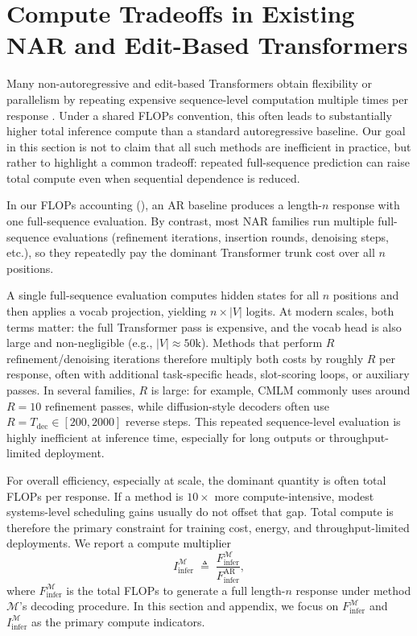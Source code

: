 \documentclass[11pt]{article}
\begin{document}
\section{Compute Tradeoffs in Existing NAR and Edit-Based Transformers}
\label{sec:why_nar_costs}

Many non-autoregressive and edit-based Transformers obtain flexibility or parallelism by repeating expensive sequence-level computation multiple times per response \citep{lee2018deterministic,ghazvininejad2019maskpredict,gu2019levenshtein,li2022diffusionlm,lou2024sedd,sahoo2024mdlm}. Under a shared FLOPs convention, this often leads to substantially higher total inference compute than a standard autoregressive baseline. Our goal in this section is not to claim that all such methods are inefficient in practice, but rather to highlight a common tradeoff: repeated full-sequence prediction can raise total compute even when sequential dependence is reduced.

In our FLOPs accounting (), an AR baseline produces a length-$n$ response with one full-sequence evaluation. By contrast, most NAR families run multiple full-sequence evaluations (refinement iterations, insertion rounds, denoising steps, etc.), so they repeatedly pay the dominant Transformer trunk cost over all $n$ positions.

A single full-sequence evaluation computes hidden states for all $n$ positions and then applies a vocab projection, yielding $n\times |V|$ logits. At modern scales, both terms matter: the full Transformer pass is expensive, and the vocab head is also large and non-negligible (e.g., $|V|\approx 50\text{k}$). Methods that perform $R$ refinement/denoising iterations therefore multiply both costs by roughly $R$ per response, often with additional task-specific heads, slot-scoring loops, or auxiliary passes. In several families, $R$ is large: for example, CMLM commonly uses around $R=10$ refinement passes, while diffusion-style decoders often use $R=T_{\text{dec}}\in[200,2000]$ reverse steps. This repeated sequence-level evaluation is highly inefficient at inference time, especially for long outputs or throughput-limited deployment.

For overall efficiency, especially at scale, the dominant quantity is often total FLOPs per response. If a method is $10\times$ more compute-intensive, modest systems-level scheduling gains usually do not offset that gap. Total compute is therefore the primary constraint for training cost, energy, and throughput-limited deployments. We report a compute multiplier
\[
I_{\text{infer}}^{\mathcal{M}} \;\triangleq\; \frac{F_{\text{infer}}^{\mathcal{M}}}{F_{\text{infer}}^{\text{AR}}},
\]
where $F_{\text{infer}}^{\mathcal{M}}$ is the total FLOPs to generate a full length-$n$ response under method $\mathcal{M}$'s decoding procedure. In this section and appendix, we focus on $F_{\text{infer}}^{\mathcal{M}}$ and $I_{\text{infer}}^{\mathcal{M}}$ as the primary compute indicators.
\end{document}
